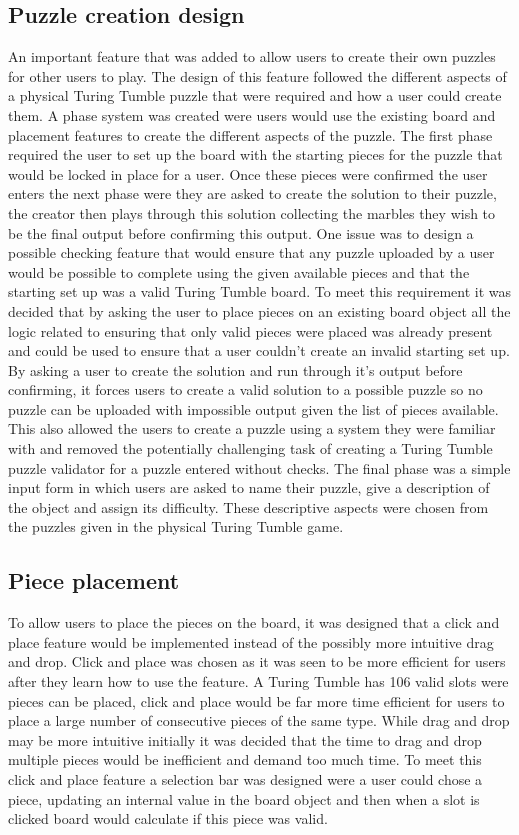 \documentclass{l4proj}
\begin{document}
\subsection{Puzzle creation design}
An important feature that was added to allow users to create their own puzzles for other users to play. The design of this feature followed the different aspects of a physical Turing Tumble puzzle that were required and how a user could create them. A phase system was created were users would use the existing board and placement features to create the different aspects of the puzzle. The first phase required the user to set up the board with the starting pieces for the puzzle that would be locked in place for a user. Once these pieces were confirmed the user enters the next phase were they are asked to create the solution to their puzzle, the creator then plays through this solution collecting the marbles they wish to be the final output before confirming this output. One issue was to design a possible checking feature that would ensure that any puzzle uploaded by a user would be possible to complete using the given available pieces and that the starting set up was a valid Turing Tumble board. To meet this requirement it was decided that by asking the user to place pieces on an existing board object all the logic related to ensuring that only valid pieces were placed was already present and could be used to ensure that a user couldn't create an invalid starting set up. By asking a user to create the solution and run through it's output before confirming, it forces users to create a valid solution to a possible puzzle so no puzzle can be uploaded with impossible output given the list of pieces available. This also allowed the users to create a puzzle using a system they were familiar with and removed the potentially challenging task of creating a Turing Tumble puzzle validator for a puzzle entered without checks. The final phase was a simple input form in which users are asked to name their puzzle, give a description of the object and assign its difficulty. These descriptive aspects were chosen from the puzzles given in the physical Turing Tumble game.

\subsection{Piece placement}
To allow users to place the pieces on the board, it was designed that a click and place feature would be implemented instead of the possibly more intuitive drag and drop. Click and place was chosen as it was seen to be more efficient for users after they learn how to use the feature. A Turing Tumble has 106 valid slots were pieces can be placed, click and place would be far more time efficient for users to place a large number of consecutive pieces of the same type. While drag and drop may be more intuitive initially it was decided that the time to drag and drop multiple pieces would be inefficient and demand too much time. To meet this click and place feature a selection bar was designed were a user could chose a piece, updating an internal value in the board object and then when a slot is clicked board would calculate if this piece was valid.
\end{document}
